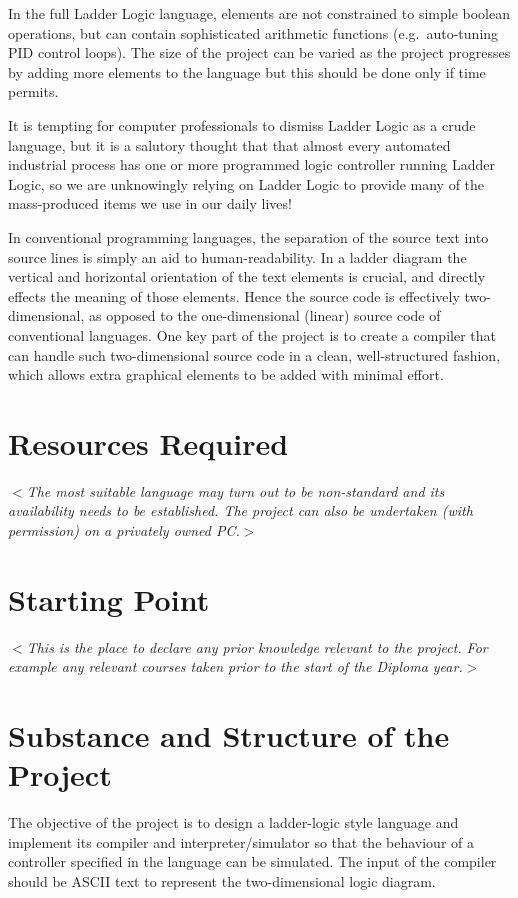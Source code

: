 \documentclass[12pt]{article}
\newcommand{\al}{$<$}
\newcommand{\ar}{$>$}
\begin{document}
In the full Ladder Logic language, elements are not constrained to
simple boolean operations, but can contain sophisticated arithmetic
functions (e.g.\ auto-tuning PID control loops). The size of the
project can be varied as the project progresses by adding more
elements to the language but this should be done only if time permits.

It is tempting for computer professionals to dismiss Ladder Logic as a
crude language, but it is a salutory thought that that almost every
automated industrial process has one or more programmed logic
controller running Ladder Logic, so we are unknowingly relying on
Ladder Logic to provide many of the mass-produced items we use in our
daily lives!

In conventional programming languages, the separation of the source
text into source lines is simply an aid to human-readability. In a
ladder diagram the vertical and horizontal orientation of the text
elements is crucial, and directly effects the meaning of those
elements. Hence the source code is effectively two-dimensional, as
opposed to the one-dimensional (linear) source code of conventional
languages. One key part of the project is to create a compiler that
can handle such two-dimensional source code in a clean,
well-structured fashion, which allows extra graphical elements to be
added with minimal effort.


\section*{Resources Required}

\al\emph{The most suitable language may turn out to be non-standard and
  its availability needs to be established.  The project can also be
  undertaken (with permission) on a privately owned PC.}\ar


\section*{Starting Point}

\al\emph{This is the place to declare any prior knowledge relevant to
  the project.  For example any relevant courses taken prior to the
  start of the Diploma year.}\ar


\section*{Substance and Structure of the Project}

The objective of the project is to design a ladder-logic style
language and implement its compiler and interpreter/simulator so that
the behaviour of a controller specified in the language can be
simulated.  The input of the compiler should be ASCII text to
represent the two-dimensional logic diagram.
 
\end{document}
